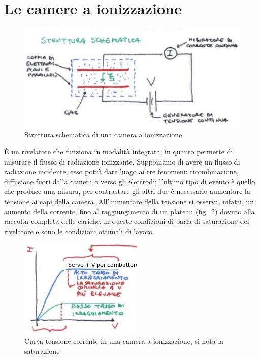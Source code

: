 \section{Le camere a ionizzazione}
\begin{figure}[htbp]
\begin{center}
	\includegraphics[scale=1]{./Immagini/CameraIonizzazione.png}
\caption{Struttura schematica di una camera a ionizzazione}
\label{fig:cameraIonizzazione}
\end{center}
\end{figure}
\`E un rivelatore che funziona in modalit\`a integrata, in quanto permette di misurare il flusso di radiazione ionizzante.
Supponiamo di avere un flusso di radiazione incidente, esso potr\`a dare luogo ai tre fenomeni: ricombinazione, diffusione fuori dalla camera o verso gli elettrodi;
l'ultimo tipo di evento \`e quello che produce una misura, per contrastare gli altri due \`e necessario aumentare la tensione ai capi della camera.
All'aumentare della tensione si osserva, infatti, un aumento della corrente, fino al raggiungimento di un plateau (fig.~\ref{fig:saturazione}) dovuto alla raccolta completa delle cariche,
in queste condizioni di parla di saturazione del rivelatore e sono le condizioni ottimali di lavoro.
\begin{figure}[htbp]
\begin{center}
\includegraphics[scale=1]{./Immagini/Saturazione.png}
\caption{Curva tensione-corrente in una camera a ionizzazione, si nota la saturazione}
\label{fig:saturazione}
\end{center}
\end{figure}
